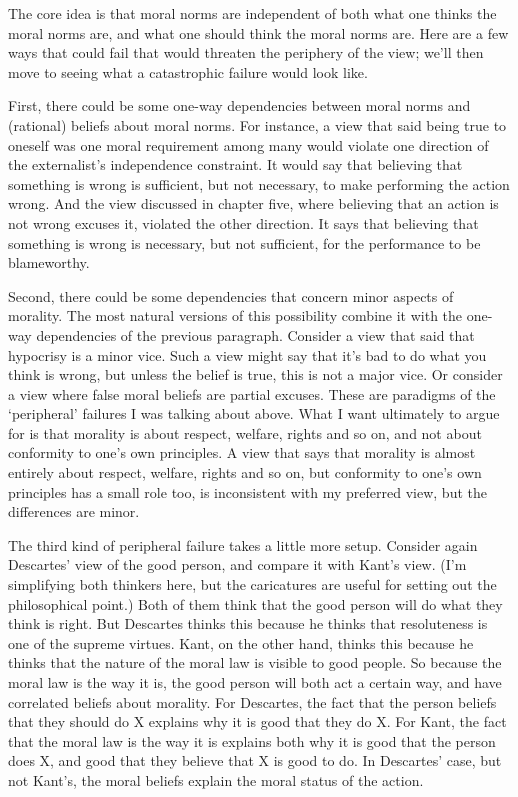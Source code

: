 \documentclass[
  10pt,
  letterpaper,
  twoside]{scrbook}
\begin{document}
The core idea is that moral norms are independent of both what one
thinks the moral norms are, and what one should think the moral norms
are. Here are a few ways that could fail that would threaten the
periphery of the view; we'll then move to seeing what a catastrophic
failure would look like.

First, there could be some one-way dependencies between moral norms and
(rational) beliefs about moral norms. For instance, a view that said
being true to oneself was one moral requirement among many would violate
one direction of the externalist's independence constraint. It would say
that believing that something is wrong is sufficient, but not necessary,
to make performing the action wrong. And the view discussed in chapter
five, where believing that an action is not wrong excuses it, violated
the other direction. It says that believing that something is wrong is
necessary, but not sufficient, for the performance to be blameworthy.

Second, there could be some dependencies that concern minor aspects of
morality. The most natural versions of this possibility combine it with
the one-way dependencies of the previous paragraph. Consider a view that
said that hypocrisy is a minor vice. Such a view might say that it's bad
to do what you think is wrong, but unless the belief is true, this is
not a major vice. Or consider a view where false moral beliefs are
partial excuses. These are paradigms of the `peripheral' failures I was
talking about above. What I want ultimately to argue for is that
morality is about respect, welfare, rights and so on, and not about
conformity to one's own principles. A view that says that morality is
almost entirely about respect, welfare, rights and so on, but conformity
to one's own principles has a small role too, is inconsistent with my
preferred view, but the differences are minor.

The third kind of peripheral failure takes a little more setup. Consider
again Descartes' view of the good person, and compare it with Kant's
view. (I'm simplifying both thinkers here, but the caricatures are
useful for setting out the philosophical point.) Both of them think that
the good person will do what they think is right. But Descartes thinks
this because he thinks that resoluteness is one of the supreme virtues.
Kant, on the other hand, thinks this because he thinks that the nature
of the moral law is visible to good people. So because the moral law is
the way it is, the good person will both act a certain way, and have
correlated beliefs about morality. For Descartes, the fact that the
person beliefs that they should do X explains why it is good that they
do X. For Kant, the fact that the moral law is the way it is explains
both why it is good that the person does X, and good that they believe
that X is good to do. In Descartes' case, but not Kant's, the moral
beliefs explain the moral status of the action.
\end{document}
